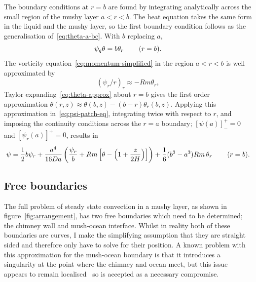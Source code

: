\documentclass[11pt]{proc}
\begin{document}
The boundary conditions at $r=b$ are found by integrating analytically across the small region of the mushy layer $a < r < b$. The heat equation takes the same form in the liquid and the mushy layer, so the first boundary condition follows as the generalisation of~\eqref{eq:theta-a-bc}. With $b$ replacing $a$,
\begin{equation}
\psi_q \theta = b \theta_r  \hspace{5ex} (r=b).
\end{equation}
The vorticity equation~\eqref{eq:momentum-simplified} in the region $a < r < b$ is well approximated by
\begin{equation}
\label{eq:psi-patch-eq}
(\psi_r/r)_r \approx -Rm \theta_r,
\end{equation}
Taylor expanding~\eqref{eq:theta-approx} about $r=b$ gives the first order approximation $\theta(r, z) \approx \theta(b, z) - (b-r) \theta_r(b, z)$. Applying this approximation in~\eqref{eq:psi-patch-eq}, integrating twice with respect to $r$, and imposing the continuity conditions across the $r=a$ boundary; $[\psi(a)]_{-}^{+} = 0$ and $[\psi_r(a)]_-^+ = 0$, results in
\begin{equation}
  \psi = \frac{1}{2} b \psi_r + \frac{a^4}{16 Da} \left(  \frac{\psi_r}{b}  +   Rm \left[ \theta - \left( 1 + \frac{z}{2H} \right) \right]  \right)  + \frac{1}{6} (b^3-a^3) Rm \, \theta_r \hspace{5ex} (r=b).
\end{equation}

\subsection{Free boundaries}
\label{sec:free-boundaries-theory}

The full problem of steady state convection in a mushy layer, as shown in figure~\ref{fig:arrangement}, has two free boundaries which need to be determined; the chimney wall and mush-ocean interface. Whilst in reality both of these boundaries are curves, I make the simplifying assumption that they are straight sided and therefore only have to solve for their position. A known problem with this approximation for the mush-ocean boundary is that it introduces a singularity at the point where the chimney and ocean meet, but this issue appears to remain localised~\citep*{schulze-worster-98} so is accepted as a necessary compromise.
\end{document}

